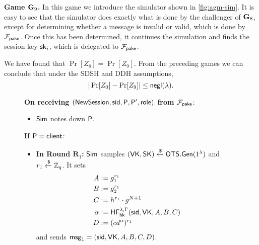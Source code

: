 \textbf{Game $\mathbf{G}_9$.} In this game we introduce the simulator shown in \cref{fig:agm-sim}. It is easy to see that the simulator does exactly what is done by the challenger of $\mathbf{G}_8$, except for determining whether a message is invalid or valid, which is done by $\mathcal{F}_{\mathsf{pake}}$. Once this has been determined, it continues the simulation and finds the session key $\mathsf{sk}_i$, which is delegated to $\mathcal{F}_{\mathsf{pake}}$.

We have found that $\Pr[Z_8]=\Pr[Z_9]$. From the preceding games we can conclude that under the SDSH and DDH assumptions, $$|\Pr[Z_0]-\Pr[Z_9]|\leq\mathsf{negl}(\lambda).$$

\begin{figure}[tbp]
	\begin{framed}\footnotesize
		\textbf{On receiving $(\mathsf{NewSession}, \mathsf{sid}, \mathsf{P}, \mathsf{P}',\mathsf{role})$ from $\mathcal{F}_{\mathsf{pake}}$}:
		\begin{itemize}
			\item $\mathsf{Sim}$ notes down $\mathsf{P}$.
		\end{itemize}
	
		\textbf{If $\mathsf{P}=\mathsf{client}$}:
		
		\begin{itemize}
			\item \textbf{In Round $\mathbf{R}_1$:} $\mathsf{Sim}$ samples $(\mathsf{VK},\mathsf{SK})\xleftarrow{\$}\mathsf{OTS}.\mathsf{Gen}(1^\lambda)$ and $r_1\xleftarrow{\$}\mathbb{Z}_q$. It sets
			\begin{align*}
				A &:= g_1^{r_1} \\B &:= g_2^{r_1}\\ C &:= h^{r_1}\cdot g^{N+1} \\ \alpha &:= \mathsf{HF}_{\mathsf{hk}}^{\lambda,\Gamma}(\mathsf{sid},\mathsf{VK},A,B,C) \\ D &:= (cd^{\alpha})^{r_1}
			\end{align*}
			and sends $\mathsf{msg}_{1} = (\mathsf{sid},\mathsf{VK},A,B,C,D)$.
			

\end{itemize}
\end{framed}
\end{figure}
